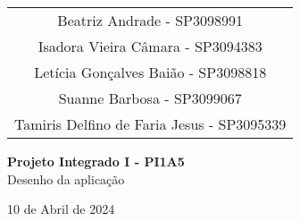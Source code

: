 \documentclass[
    12pt,               %
    openright,          %
    oneside,
    a4paper,            %
    hyphens,
    paginasA3,  %
    GLOSSARIO, %
    TODO, %
    english,            %
    brazil           %
    ]{regras-pi1a5} %
\begin{document}
\begin{titlepage}
    \begin{center}
        \vspace*{1cm}
        
        \begin{tabular}{c}
            {\large Beatriz Andrade - SP3098991} \\
            {\large Isadora Vieira Câmara - SP3094383} \\
            {\large Letícia Gonçalves Baião - SP3098818} \\
            {\large Suanne Barbosa - SP3099067} \\
            {\large Tamiris Delfino de Faria Jesus - SP3095339} \\
        \end{tabular}
        
        \vspace{6cm}
        
        \textbf{\LARGE{Projeto Integrado I - PI1A5}}\\
        \vspace{0.2cm}
        {\large{Desenho da aplicação}}
    
        \vfill
        
        \large{10 de Abril de 2024}
        
    \end{center}
\end{titlepage}

\renewcommand{\vhhistoryname}{Histórico de Revisões}
\renewcommand{\vhversionname}{Revisão}
\renewcommand{\vhdatename}{Data}
\renewcommand{\vhauthorname}{Autores}
\renewcommand{\vhchangename}{Descrição}

\begin{versionhistory}
\end{versionhistory}

\cleardoublepage

\listoffigures*
\cleardoublepage


\end{document}
